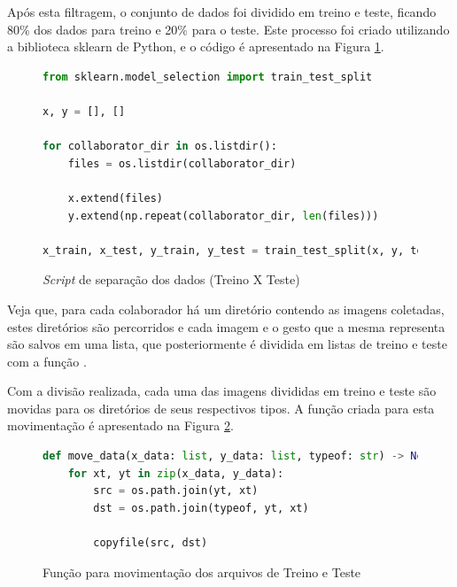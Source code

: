 
\par Após esta filtragem, o conjunto de dados foi dividido em treino e teste, ficando 80\% dos dados para treino e 20\% para o teste. Este processo foi criado utilizando a biblioteca sklearn de Python, e o código é apresentado na Figura \ref{figure:split_train_test_data}.

\begin{figure}[H]
    \centering
    \begin{lstlisting}[language=Python]
from sklearn.model_selection import train_test_split

x, y = [], []

for collaborator_dir in os.listdir():
    files = os.listdir(collaborator_dir)

    x.extend(files)
    y.extend(np.repeat(collaborator_dir, len(files)))

x_train, x_test, y_train, y_test = train_test_split(x, y, test_size=0.20, random_state=992)    
\end{lstlisting}
    \caption{\textit{Script} de separação dos dados (Treino X Teste)}
    \label{figure:split_train_test_data}
\end{figure}

\par Veja que, para cada colaborador há um diretório contendo as imagens coletadas, estes diretórios são percorridos e cada imagem e o gesto que a mesma representa são salvos em uma lista, que posteriormente é dividida em listas de treino e teste com a função .

\par Com a divisão realizada, cada uma das imagens divididas em treino e teste são movidas para os diretórios de seus respectivos tipos. A função criada para esta movimentação é apresentado na Figura \ref{figure:move_splitted_data}.

\begin{figure}[H]
    \centering
    \begin{lstlisting}[language=Python]
def move_data(x_data: list, y_data: list, typeof: str) -> None:
    for xt, yt in zip(x_data, y_data):
        src = os.path.join(yt, xt)
        dst = os.path.join(typeof, yt, xt)
        
        copyfile(src, dst)
\end{lstlisting}
    \caption{Função para movimentação dos arquivos de Treino e Teste}
    \label{figure:move_splitted_data}
\end{figure}

